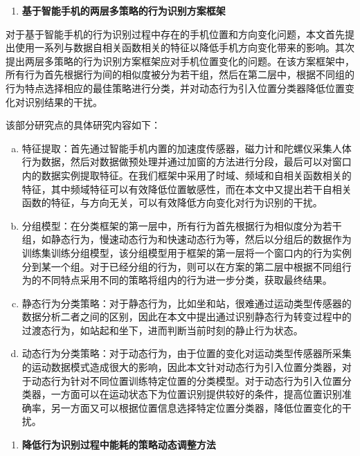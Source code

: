 \begin{enumerate}[(1)]
\item \textbf{基于智能手机的两层多策略的行为识别方案框架
}
\end{enumerate}

\par 对于基于智能手机的行为识别过程中存在的手机位置和方向变化问题，本文首先提出使用一系列与数据自相关函数相关的特征以降低手机方向变化带来的影响。其次提出两层多策略的行为识别方案框架应对手机位置变化的问题。在该方案框架中，所有行为首先根据行为间的相似度被分为若干组，然后在第二层中，根据不同组的行为特点选择相应的最佳策略进行分类，并对动态行为引入位置分类器降低位置变化对识别结果的干扰。
\par 该部分研究点的具体研究内容如下：

\begin{enumerate}[a)]
\item 特征提取：首先通过智能手机内置的加速度传感器，磁力计和陀螺仪采集人体行为数据，然后对数据做预处理并通过加窗的方法进行分段，最后可以对窗口内的数据实例提取特征。在我们框架中采用了时域、频域和自相关函数相关的特征，其中频域特征可以有效降低位置敏感性，而在本文中又提出若干自相关函数的特征，与方向无关，可以有效降低方向变化对行为识别的干扰。
\item 分组模型：在分类框架的第一层中，所有行为首先根据行为相似度分为若干组，如静态行为，慢速动态行为和快速动态行为等，然后以分组后的数据作为训练集训练分组模型，该分组模型用于框架的第一层将一个窗口内的行为实例分到某一个组。对于已经分组的行为，则可以在方案的第二层中根据不同组行为的不同特点采用不同的策略将组内的行为进一步分类，获取最终结果。
\item 静态行为分类策略：对于静态行为，比如坐和站，很难通过运动类型传感器的数据分析二者之间的区别，因此在本文中提出通过识别静态行为转变过程中的过渡态行为，如站起和坐下，进而判断当前时刻的静止行为状态。
\item 动态行为分类策略：对于动态行为，由于位置的变化对运动类型传感器所采集的运动数据模式造成很大的影响，因此本文针对动态行为引入位置分类器，对于动态行为针对不同位置训练特定位置的分类模型。对于动态行为引入位置分类器，一方面可以在运动状态下为位置识别提供较好的条件，提高位置识别准确率，另一方面又可以根据位置信息选择特定位置分类器，降低位置变化的干扰。
\end{enumerate}

\begin{enumerate}[(2)]
\item \textbf{降低行为识别过程中能耗的策略动态调整方法
}
\end{enumerate}

